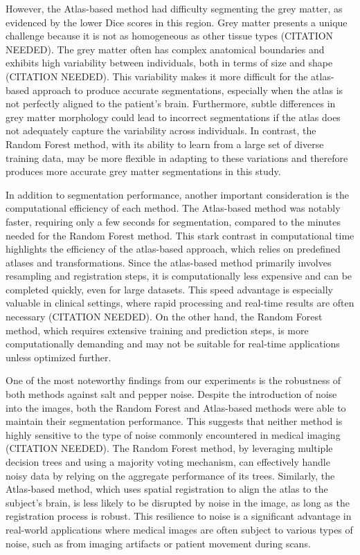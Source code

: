 However, the Atlas-based method had difficulty segmenting the grey matter, as evidenced by the lower Dice scores in this region. Grey matter presents a unique challenge because it is not as homogeneous as other tissue types (CITATION NEEDED). The grey matter often has complex anatomical boundaries and exhibits high variability between individuals, both in terms of size and shape (CITATION NEEDED). This variability makes it more difficult for the atlas-based approach to produce accurate segmentations, especially when the atlas is not perfectly aligned to the patient's brain. Furthermore, subtle differences in grey matter morphology could lead to incorrect segmentations if the atlas does not adequately capture the variability across individuals. In contrast, the Random Forest method, with its ability to learn from a large set of diverse training data, may be more flexible in adapting to these variations and therefore produces more accurate grey matter segmentations in this study.

In addition to segmentation performance, another important consideration is the computational efficiency of each method. The Atlas-based method was notably faster, requiring only a few seconds for segmentation, compared to the minutes needed for the Random Forest method. This stark contrast in computational time highlights the efficiency of the atlas-based approach, which relies on predefined atlases and transformations. Since the atlas-based method primarily involves resampling and registration steps, it is computationally less expensive and can be completed quickly, even for large datasets. This speed advantage is especially valuable in clinical settings, where rapid processing and real-time results are often necessary (CITATION NEEDED). On the other hand, the Random Forest method, which requires extensive training and prediction steps, is more computationally demanding and may not be suitable for real-time applications unless optimized further.

One of the most noteworthy findings from our experiments is the robustness of both methods against salt and pepper noise. Despite the introduction of noise into the images, both the Random Forest and Atlas-based methods were able to maintain their segmentation performance. This suggests that neither method is highly sensitive to the type of noise commonly encountered in medical imaging (CITATION NEEDED). The Random Forest method, by leveraging multiple decision trees and using a majority voting mechanism, can effectively handle noisy data by relying on the aggregate performance of its trees. Similarly, the Atlas-based method, which uses spatial registration to align the atlas to the subject's brain, is less likely to be disrupted by noise in the image, as long as the registration process is robust. This resilience to noise is a significant advantage in real-world applications where medical images are often subject to various types of noise, such as from imaging artifacts or patient movement during scans.


